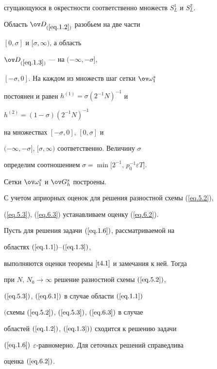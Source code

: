 сгущающуюся в окрестности соответственно множеств $S^1_L$ и $S^2_L$.


Область $\ov D_{(\ref{eq.1.2})}$ разобьем на две части


$[0, \sigma]$ и $[\sigma, \infty)$, а область


$\ov D_{(\ref{eq.1.3})}$ --- на $(-\infty, -\sigma]$,


$[-\sigma, 0]$. На каждом из множеств шаг сетки $\ov\omega^s_1$


постоянен и равен $h^{(1)}=\sigma{(2^{-1} N)}^{-1}$ и


$h^{(2)}=(1-\sigma){(2^{-1} N)}^{-1}$


на множествах $[-\sigma, 0]$, $[0, \sigma]$ и


$(-\infty, -\sigma]$, $[\sigma, \infty)$ соответственно. Величину $\sigma$


определим соотношением $\sigma=\min[2^{-1}$, $p_0^{-1}\varepsilon T]$.


Сетки $\ov\omega^s_1$ и $\ov G^s_h$ построены.





С учетом априорных оценок для решения разностной схемы (\ref{eq.5.2}),


(\ref{eq.5.3}), (\ref{eq.6.3}) устанавливаем оценку (\ref{eq.6.2}).





\begin{thms} \label{t6.1}


Пусть для решения задачи $(\ref{eq.1.6})$, рассматриваемой на


областях $(\ref{eq.1.1})$--$(\ref{eq.1.3})$,


выполняются оценки теоремы $\ref{t4.1}$ и замечания к ней. Тогда


при $N$, $N_0\to \infty$ решение разностной схемы $(\ref{eq.5.2})$,


$(\ref{eq.5.3})$, $(\ref{eq.6.1})$ в случае области $(\ref{eq.1.1})$


$($схемы $(\ref{eq.5.2})$, $(\ref{eq.5.3})$, $(\ref{eq.6.3})$ в случае


областей $(\ref{eq.1.2})$, $(\ref{eq.1.3}))$ сходится к решению задачи


$(\ref{eq.1.6})$\; $\varepsilon$-равномерно. Для сеточных решений справедлива


оценка $(\ref{eq.6.2})$.


\end{thms}





